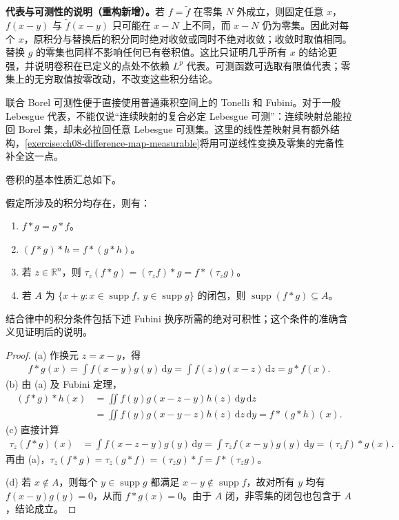 \documentclass[../../main.tex]{subfiles}
\begin{document}
\begin{remark}
\textbf{代表与可测性的说明（重构新增）。}若 $f=\widetilde f$ 在零集 $N$ 外成立，则固定任意 $x$，$f(x-y)$ 与 $\widetilde f(x-y)$ 只可能在 $x-N$ 上不同，而 $x-N$ 仍为零集。因此对每个 $x$，原积分与替换后的积分同时绝对收敛或同时不绝对收敛；收敛时取值相同。替换 $g$ 的零集也同样不影响任何已有卷积值。这比只证明几乎所有 $x$ 的结论更强，并说明卷积在已定义的点处不依赖 $L^p$ 代表。可测函数可选取有限值代表；零集上的无穷取值按零改动，不改变这些积分结论。

联合 Borel 可测性便于直接使用普通乘积空间上的 Tonelli 和 Fubini。对于一般 Lebesgue 代表，不能仅说“连续映射的复合必定 Lebesgue 可测”：连续映射总能拉回 Borel 集，却未必拉回任意 Lebesgue 可测集。这里的线性差映射具有额外结构，\cref{exercise:ch08-difference-map-measurable}将用可逆线性变换及零集的完备性补全这一点。
\end{remark}
卷积的基本性质汇总如下。
\begin{proposition}\label{proposition:ch08-convolution-properties}
假定所涉及的积分均存在，则有：
\begin{enumerate}
\item\label{item:ch08-convolution-commutative}$f*g=g*f$。
\item\label{item:ch08-convolution-associative}$(f*g)*h=f*(g*h)$。
\item\label{item:ch08-convolution-translation}若 $z\in\mathbb R^n$，则 $\tau_z(f*g)=(\tau_zf)*g=f*(\tau_zg)$。
\item\label{item:ch08-convolution-support}若 $A$ 为 $\{x+y:x\in\operatorname{supp}f,\ y\in\operatorname{supp}g\}$ 的闭包，则 $\operatorname{supp}(f*g)\subseteq A$。
\end{enumerate}
结合律中的积分条件包括下述 Fubini 换序所需的绝对可积性；这个条件的准确含义见证明后的说明。
\end{proposition}
\begin{proof}
(a) 作换元 $z=x-y$，得
\begin{align*}
f*g(x)=\int f(x-y)g(y)\,\mathrm dy
=\int f(z)g(x-z)\,\mathrm dz=g*f(x).
\end{align*}
(b) 由 (a) 及 Fubini 定理，
\begin{align*}
(f*g)*h(x)
&=\iint f(y)g(x-z-y)h(z)\,\mathrm dy\,\mathrm dz\\
&=\iint f(y)g(x-y-z)h(z)\,\mathrm dz\,\mathrm dy
=f*(g*h)(x).
\end{align*}
(c) 直接计算
\begin{align*}
\tau_z(f*g)(x)
&=\int f(x-z-y)g(y)\,\mathrm dy
=\int\tau_zf(x-y)g(y)\,\mathrm dy=(\tau_zf)*g(x).
\end{align*}
再由 (a)，$\tau_z(f*g)=\tau_z(g*f)=(\tau_zg)*f=f*(\tau_zg)$。

(d) 若 $x\notin A$，则每个 $y\in\operatorname{supp}g$ 都满足 $x-y\notin\operatorname{supp}f$，故对所有 $y$ 均有 $f(x-y)g(y)=0$，从而 $f*g(x)=0$。由于 $A$ 闭，非零集的闭包也包含于 $A$，结论成立。
\end{proof}
\end{document}
